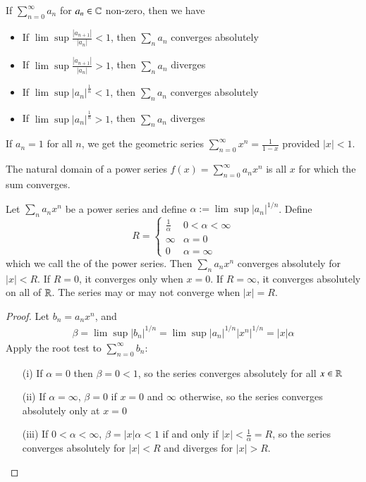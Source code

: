 \begin{theorem}
    If $\sum_{n=0}^{\infty}a_n$ for $a_n \in \mathbb C$ non-zero, then we have \begin{itemize}
        \item If $\lim\sup\frac{|a_{n+1}|}{|a_n|} < 1$, then $\sum_na_n$ converges absolutely
        \item If $\lim\sup\frac{|a_{n+1}|}{|a_n|} > 1$, then $\sum_na_n$ diverges
        \item If $\lim\sup|a_n|^{\frac{1}{n}} < 1$, then $\sum_na_n$ converges absolutely
        \item If $\lim\sup|a_n|^{\frac{1}{n}} > 1$, then $\sum_na_n$ diverges
    \end{itemize}
\end{theorem}

\begin{example}
    If $a_n = 1$ for all $n$, we get the geometric series $\sum_{n=0}^{\infty}x^n = \frac{1}{1-x}$ provided $|x| < 1$.
\end{example}
The natural domain of a power series $f(x) = \sum_{n=0}^{\infty}a_nx^n$ is all $x$ for which the sum converges.

\begin{proposition}
    Let $\sum_na_nx^n$ be a power series and define $\alpha:= \lim\sup|a_n|^{1/n}$. Define $$R = \left\{\begin{array}{cc}\frac{1}{\alpha} & 0 < \alpha < \infty \\ \infty & \alpha = 0 \\ 0 & \alpha = \infty \end{array}\right.$$
    which we call the  of the power series. Then $\sum_na_nx^n$ converges absolutely for $|x| < R$. If $R = 0$, it converges only when $x = 0$. If $R = \infty$, it converges absolutely on all of $\mathbb R$. The series may or may not converge when $|x| = R$.
\end{proposition}
\begin{proof}
    Let $b_n = a_nx^n$, and \begin{align*}
        \beta = \lim\sup|b_n|^{1/n} = \lim\sup|a_n|^{1/n}|x^n|^{1/n} = |x|\alpha
    \end{align*}
    Apply the root test to $\sum_{n=0}^{\infty}b_n$: \begin{itemize}
        \item[(i)] If $\alpha = 0$ then $\beta = 0 <1$, so the series converges absolutely for all $x \in \mathbb R$
        \item[(ii)] If $\alpha = \infty$, $\beta = 0$ if $x = 0$ and $\infty$ otherwise, so the series converges absolutely only at $x  =0$
        \item[(iii)] If $0 < \alpha < \infty$, $\beta = |x| \alpha < 1$ if and only if $|x| < \frac{1}{\alpha} = R$, so the series converges absolutely for $|x| < R$ and diverges for $|x| > R$.
    \end{itemize}
\end{proof}

